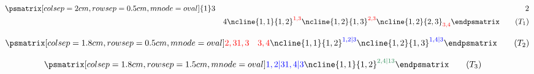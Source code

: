 \documentclass[crop,tikz]{standalone}
\title{}
\author{}
\begin{document}
\footnotesize
\begin{align}
\psmatrix[colsep=2cm,rowsep=0.5cm,mnode= oval]
{1}&{3}&{2}\\
&&{4}
\ncline{1,1}{1,2}^{\textcolor{red}{1,3}}
\ncline{1,2}{1,3}^{\textcolor{red}{2,3}}
\ncline{1,2}{2,3}_{\textcolor{red}{3,4}}
\endpsmatrix
\tag{$T_1$}
\end{align}

\begin{align}
\psmatrix[colsep=1.8cm,rowsep=0.5cm,mnode= oval]
\textcolor{red}{2,3} &\textcolor{red}{1,3}&\textcolor{red}{3,4}
\ncline{1,1}{1,2}^{\textcolor{blue}{1,2|3}}
\ncline{1,2}{1,3}^{\textcolor{blue}{1,4|3}}
\endpsmatrix
\tag{$T_2$}
\end{align}

\begin{align}
\psmatrix[colsep=1.8cm,rowsep=1.5cm,mnode=oval]
\textcolor{blue}{1,2|3}&\textcolor{blue}{1,4|3}
\ncline{1,1}{1,2}^{\textcolor{seagreen}{2,4|13}}
\endpsmatrix
\tag{$T_3$}
\end{align}
\end{document}
